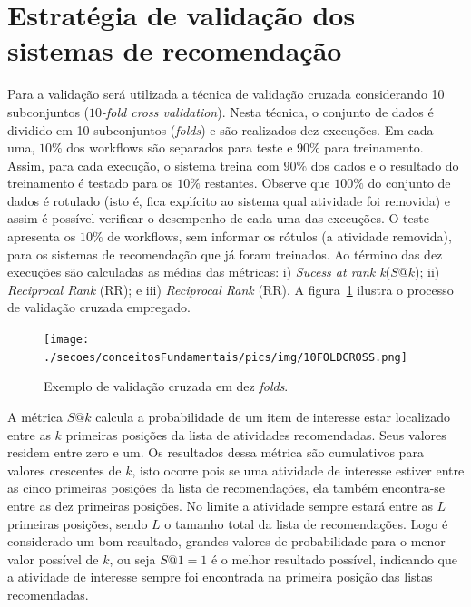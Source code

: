 \section{Estratégia de validação dos sistemas de recomendação} \label{SEC_METRICAS_VALIDACAO}
Para a validação será utilizada a técnica de validação cruzada considerando 10 subconjuntos (\emph{\(10\)-fold cross validation}). Nesta técnica, o conjunto de dados é dividido em 10 subconjuntos (\emph{folds}) e são realizados dez execuções. Em cada uma, \(10\%\) dos workflows são separados para teste e \(90\%\) para treinamento. Assim, para cada execução, o sistema treina com \(90\%\) dos dados e o resultado do treinamento é testado para os \(10\%\) restantes. Observe que \(100\%\) do conjunto de dados é rotulado (isto é, fica explícito ao sistema qual atividade foi removida) e assim é possível verificar o desempenho de cada uma das execuções. O teste apresenta os \(10\%\) de workflows, sem informar os rótulos (a atividade removida), para os sistemas de recomendação que já foram treinados. Ao término das dez execuções são calculadas as médias das métricas: i) \emph{Sucess at rank k}(\(S@k\)); ii) \emph{Reciprocal Rank} (RR); e iii) \emph{Reciprocal Rank} (RR). A figura~\ref{figura_10_fold_cross_validation} ilustra o processo de validação cruzada empregado.
\begin{figure}[!hbt]
    \centering   
    \caption{Exemplo de validação cruzada em dez \emph{folds}.}
    \texttt{[image: ./secoes/conceitosFundamentais/pics/img/10FOLDCROSS.png]}
	\label{figura_10_fold_cross_validation}
\end{figure}

A métrica \(S@k\) calcula a probabilidade de um item de interesse estar localizado entre as \(k\) primeiras posições da lista de atividades recomendadas. Seus valores residem entre zero e um. Os resultados dessa métrica são cumulativos para valores crescentes de \(k\), isto ocorre pois se uma atividade de interesse estiver entre as cinco primeiras posições da lista de recomendações, ela também encontra-se entre as dez primeiras posições. No limite a atividade sempre estará entre as \(L\) primeiras posições, sendo \(L\) o tamanho total da lista de recomendações. Logo é considerado um bom resultado, grandes valores de probabilidade para o menor valor possível de \(k\), ou seja \(S@1 = 1\) é o melhor resultado possível, indicando que a atividade de interesse sempre foi encontrada na primeira posição das listas recomendadas.


